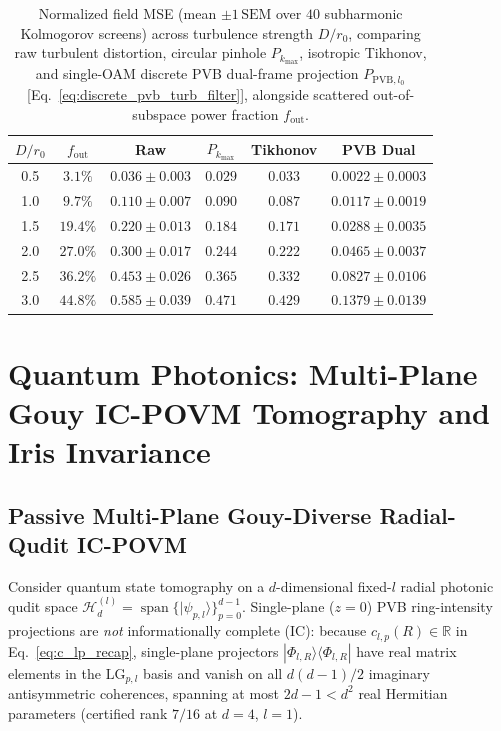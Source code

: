 \documentclass[aps,pra,reprint,nofootinbib,floatfix,longbibliography]{revtex4-2}
\newcommand{\ket}[1]{| #1 \rangle}
\newcommand{\bra}[1]{\langle #1 |}
\begin{document}
\begin{table}[t]
\caption{Normalized field MSE (mean $\pm 1\,\mathrm{SEM}$ over $40$ subharmonic Kolmogorov screens) across turbulence strength $D/r_0$, comparing raw turbulent distortion, circular pinhole $P_{k_{\max}}$, isotropic Tikhonov, and single-OAM discrete PVB dual-frame projection $P_{\mathrm{PVB},l_0}$ [Eq.~\eqref{eq:discrete_pvb_turb_filter}], alongside scattered out-of-subspace power fraction $f_{\mathrm{out}}$.}
\label{tab:kolmogorov}
\begin{ruledtabular}
\footnotesize
\setlength{\tabcolsep}{1.8pt}
\begin{tabular}{cccccc}
$D/r_0$ & $f_{\mathrm{out}}$ & Raw & $P_{k_{\max}}$ & Tikhonov & PVB Dual \\
\hline
0.5 & $3.1\%$ & $0.036\pm 0.003$ & $0.029$ & $0.033$ & $0.0022\pm 0.0003$ \\
1.0 & $9.7\%$ & $0.110\pm 0.007$ & $0.090$ & $0.087$ & $0.0117\pm 0.0019$ \\
1.5 & $19.4\%$ & $0.220\pm 0.013$ & $0.184$ & $0.171$ & $0.0288\pm 0.0035$ \\
2.0 & $27.0\%$ & $0.300\pm 0.017$ & $0.244$ & $0.222$ & $0.0465\pm 0.0037$ \\
2.5 & $36.2\%$ & $0.453\pm 0.026$ & $0.365$ & $0.332$ & $0.0827\pm 0.0106$ \\
3.0 & $44.8\%$ & $0.585\pm 0.039$ & $0.471$ & $0.429$ & $0.1379\pm 0.0139$ \\
\end{tabular}
\end{ruledtabular}
\end{table}

\section{Quantum Photonics: Multi-Plane Gouy IC-POVM Tomography and Iris Invariance}
\label{sec:quantum}

\subsection{Passive Multi-Plane Gouy-Diverse Radial-Qudit IC-POVM}
\label{subsec:povm}

Consider quantum state tomography on a $d$-dimensional fixed-$l$ radial photonic qudit space $\mathcal{H}_d^{(l)} = \operatorname{span}\{\ket{\psi_{p,l}}\}_{p=0}^{d-1}$. Single-plane ($z = 0$) PVB ring-intensity projections are \emph{not} informationally complete (IC): because $c_{l,p}(R) \in \mathbb{R}$ in Eq.~\eqref{eq:c_lp_recap}, single-plane projectors $\ket{\Phi_{l,R}}\bra{\Phi_{l,R}}$ have real matrix elements in the $\mathrm{LG}_{p,l}$ basis and vanish on all $d(d-1)/2$ imaginary antisymmetric coherences, spanning at most $2d - 1 < d^2$ real Hermitian parameters (certified rank $7/16$ at $d = 4$, $l = 1$).
\end{document}
